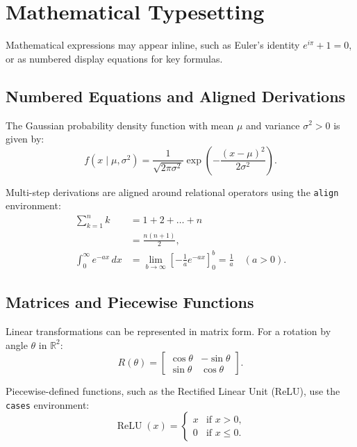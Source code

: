 \documentclass[11pt, a4paper]{article}
\theoremstyle{plain}
\theoremstyle{definition}
\theoremstyle{remark}
\begin{document}
\section{Mathematical Typesetting}
\label{sec:math}

Mathematical expressions may appear inline, such as Euler's identity $e^{i\pi} + 1 = 0$, or as numbered display equations for key formulas.

\subsection{Numbered Equations and Aligned Derivations}

The Gaussian probability density function with mean $\mu$ and variance $\sigma^2 > 0$ is given by:
\begin{equation}
  \label{eq:gaussian}
  f(x \mid \mu, \sigma^2) = \frac{1}{\sqrt{2\pi\sigma^2}} \exp\!\left( -\frac{(x - \mu)^2}{2\sigma^2} \right).
\end{equation}

Multi-step derivations are aligned around relational operators using the \texttt{align} environment:
\begin{align}
  \sum_{k=1}^{n} k &= 1 + 2 + \dots + n \nonumber \\
  &= \frac{n(n + 1)}{2}, \label{eq:arith-sum} \\
  \int_{0}^{\infty} e^{-ax}\,dx &= \lim_{b \to \infty} \left[ -\frac{1}{a} e^{-ax} \right]_{0}^{b} = \frac{1}{a} \quad (a > 0). \label{eq:exp-int}
\end{align}

\subsection{Matrices and Piecewise Functions}

Linear transformations can be represented in matrix form. For a rotation by angle $\theta$ in $\mathbb{R}^2$:
\begin{equation}
  \label{eq:rotation}
  R(\theta) =
  \begin{bmatrix}
    \cos\theta & -\sin\theta \\
    \sin\theta & \cos\theta
  \end{bmatrix}.
\end{equation}

Piecewise-defined functions, such as the Rectified Linear Unit (ReLU), use the \texttt{cases} environment:
\begin{equation}
  \label{eq:relu}
  \operatorname{ReLU}(x) =
  \begin{cases}
    x & \text{if } x > 0, \\
    0 & \text{if } x \le 0.
  \end{cases}
\end{equation}
\end{document}

